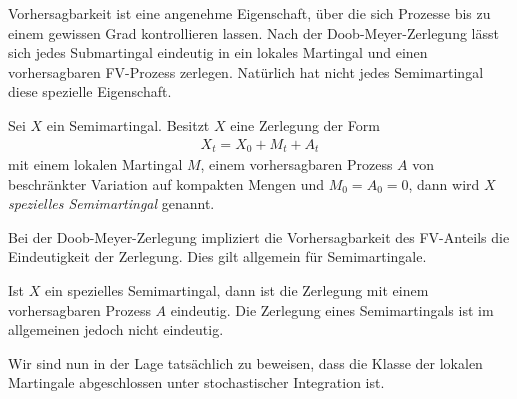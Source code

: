 Vorhersagbarkeit ist eine angenehme Eigenschaft, über die sich Prozesse bis zu
einem gewissen Grad kontrollieren lassen. Nach der Doob-Meyer-Zerlegung lässt
sich jedes Submartingal eindeutig in ein lokales Martingal und einen
vorhersagbaren FV-Prozess zerlegen. Natürlich hat nicht jedes Semimartingal
diese spezielle Eigenschaft.

\begin{definition}
\label{defn:3.3}
Sei $X$ ein Semimartingal. Besitzt $X$ eine Zerlegung der Form
\begin{align*}
X_t=X_0+M_t+A_t
\end{align*} 
mit einem lokalen Martingal $M$, einem vorhersagbaren Prozess $A$ von
beschränkter Variation auf kompakten Mengen und $M_0=A_0=0$, dann wird $X$
\emph{spezielles Semimartingal} genannt.\fish
\end{definition}

Bei der Doob-Meyer-Zerlegung impliziert die Vorhersagbarkeit des FV-Anteils die
Eindeutigkeit der Zerlegung. Dies gilt allgemein für Semimartingale.

\begin{theorem}
\label{specialsemi}
\label{prop:3.4}
 Ist $X$ ein spezielles Semimartingal, dann
  ist die Zerlegung mit einem vorhersagbaren Prozess $A$ eindeutig. Die
  Zerlegung eines Semimartingals ist im allgemeinen jedoch nicht eindeutig.\fish
\end{theorem}

Wir sind nun in der Lage tatsächlich zu beweisen, dass die Klasse der lokalen
Martingale abgeschlossen unter stochastischer Integration ist.

